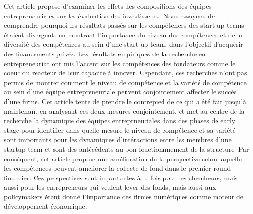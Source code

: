 \documentclass[12pt]{article}
\begin{document}
Cet article propose d'examiner les effets des compositions des équipes entrepreneuriales sur les évaluation des investisseurs. Nous essayons de comprendre pourquoi les résultats passés sur les compétences des start-up teams étaient divergents en montrant l'importance du niveau des compétences et de la diversité des compétences au sein d'une start-up team, dans l'objectif d'acquérir des financements privés. Les résultats empiriques de la recherche en entrepreneuriat ont mis l'accent sur les compétences des fondateurs comme le coeur du réacteur de leur capacité à innover. Cependant, ces recherches n'ont pas permis de montrer comment le niveau de compétence et la variété de compétence au sein d'une équipe entrepreneuriale peuvent conjointement affecter le succès d'une firme. Cet article tente de prendre le contrepied de ce qui a été fait jusqu'à maintenant en analysant ces deux mesures conjointement, et met au centre de la recherche la dynamique des équipes entreprneuriales dans des phases de early stage pour identifier dans quelle mesure le niveau de compétence et sa variété sont importants pour les dynamiques d'intéractions entre les membres d'une startup-team et sont des antécédents au bon fonctionnnement de la structure. Par conséquent, cet article propose une amélioration de la perspective selon laquelle les compétences peuvent améliorer la collecte de fond dans le premier round financier. Ces perspectives sont importantes à la fois pour les chercheurs, mais aussi pour les entrepreneurs qui veulent lever des fonds, mais aussi aux policymakers étant donné l'importance des firmes numériques comme moteur de développement économique.
\end{document}
